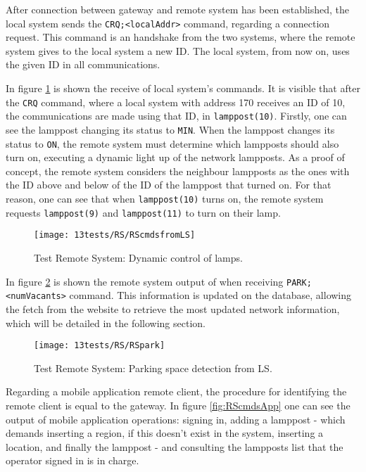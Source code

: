 After connection between gateway and remote system has been established, the local system sends the \verb|CRQ;<localAddr>| command, regarding a connection request. This command is an handshake from the two systems, where the remote system gives to the local system a new ID. The local system, from now on, uses the given ID in all communications.

In figure \ref{fig:RScmdsfromLS} is shown the receive of local system's commands. It is visible that after the \verb|CRQ| command, where a local system with address 170 receives an ID of 10, the communications are made using that ID, in \verb|lamppost(10)|. Firstly, one can see the lamppost changing its status to \verb|MIN|. When the lamppost changes its status to \verb|ON|, the remote system must determine which lampposts should also turn on, executing a dynamic light up of the network lampposts. As a proof of concept, the remote system considers the neighbour lampposts as the ones with the ID above and below of the ID of the lamppost that turned on. For that reason, one can see that when \verb|lamppost(10)| turns on, the remote system requests \verb|lamppost(9)| and \verb|lamppost(11)| to turn on their lamp.

\begin{figure}[H]
	\centering	
	\texttt{[image: 13tests/RS/RScmdsfromLS]}
	\caption{Test Remote System: Dynamic control of lamps.}
	\label{fig:RScmdsfromLS}
\end{figure}

In figure \ref{fig:RSpark} is shown the remote system output of when receiving \linebreak \verb|PARK;<numVacants>| command. This information is updated on the database, allowing the fetch from the website to retrieve the most updated network information, which will be detailed in the following section.

\begin{figure}[H]
	\centering	
	\texttt{[image: 13tests/RS/RSpark]}
	\caption{Test Remote System: Parking space detection from LS.}
	\label{fig:RSpark}
\end{figure}

Regarding a mobile application remote client, the procedure for identifying the remote client is equal to the gateway. In figure \ref{fig:RScmdsApp} one can see the output of mobile application operations: signing in, adding a lamppost - which demands inserting a region, if this doesn't exist in the system, inserting a location, and finally the lamppost - and consulting the lampposts list that the operator signed in is in charge.

